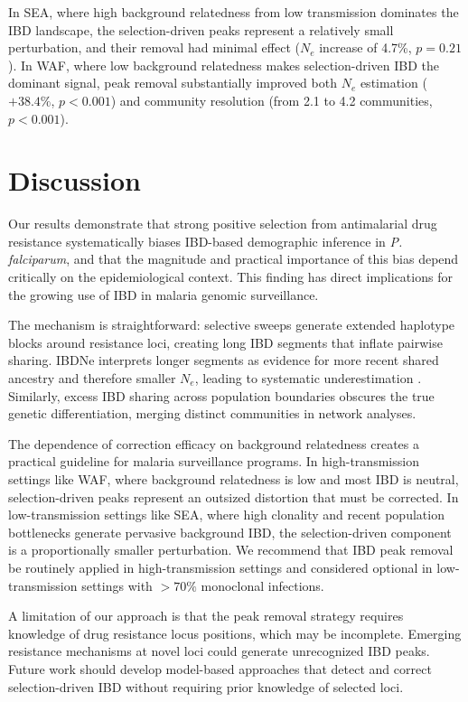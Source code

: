 \documentclass[11pt]{article}
\begin{document}
In SEA, where high background relatedness from low transmission dominates the IBD landscape, the selection-driven peaks represent a relatively small perturbation, and their removal had minimal effect ($N_e$ increase of 4.7\%, $p = 0.21$). In WAF, where low background relatedness makes selection-driven IBD the dominant signal, peak removal substantially improved both $N_e$ estimation ($+38.4\%$, $p < 0.001$) and community resolution (from 2.1 to 4.2 communities, $p < 0.001$).

\section{Discussion}

Our results demonstrate that strong positive selection from antimalarial drug resistance systematically biases IBD-based demographic inference in \textit{P. falciparum}, and that the magnitude and practical importance of this bias depend critically on the epidemiological context. This finding has direct implications for the growing use of IBD in malaria genomic surveillance.

The mechanism is straightforward: selective sweeps generate extended haplotype blocks around resistance loci, creating long IBD segments that inflate pairwise sharing. IBDNe interprets longer segments as evidence for more recent shared ancestry and therefore smaller $N_e$, leading to systematic underestimation \citep{browning2015accurate, charlesworth2009effective}. Similarly, excess IBD sharing across population boundaries obscures the true genetic differentiation, merging distinct communities in network analyses.

The dependence of correction efficacy on background relatedness creates a practical guideline for malaria surveillance programs. In high-transmission settings like WAF, where background relatedness is low and most IBD is neutral, selection-driven peaks represent an outsized distortion that must be corrected. In low-transmission settings like SEA, where high clonality and recent population bottlenecks generate pervasive background IBD, the selection-driven component is a proportionally smaller perturbation. We recommend that IBD peak removal be routinely applied in high-transmission settings and considered optional in low-transmission settings with $>70\%$ monoclonal infections.

A limitation of our approach is that the peak removal strategy requires knowledge of drug resistance locus positions, which may be incomplete. Emerging resistance mechanisms at novel loci could generate unrecognized IBD peaks. Future work should develop model-based approaches that detect and correct selection-driven IBD without requiring prior knowledge of selected loci.
\end{document}
